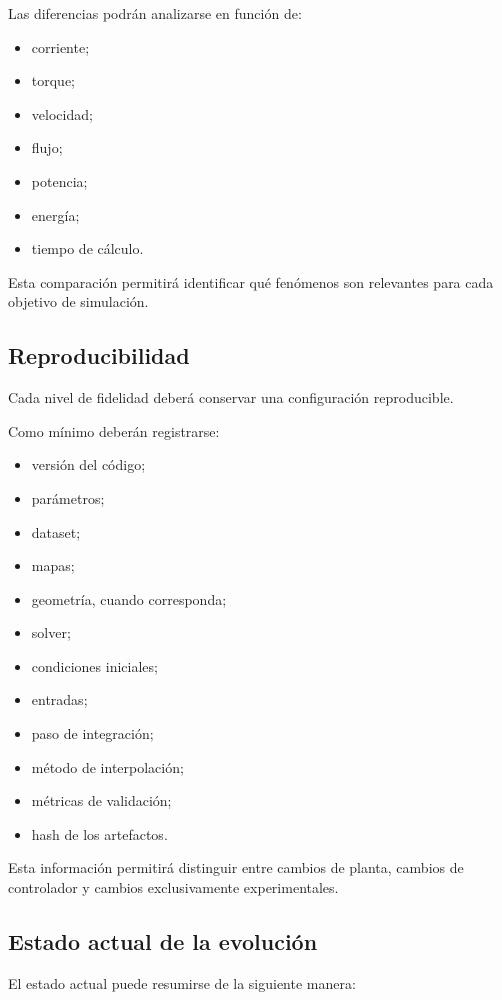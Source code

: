 Las diferencias podrán analizarse en función de:

\begin{itemize}
\item corriente;
\item torque;
\item velocidad;
\item flujo;
\item potencia;
\item energía;
\item tiempo de cálculo.
\end{itemize}

Esta comparación permitirá identificar qué fenómenos son relevantes para cada objetivo de simulación.

\subsection{Reproducibilidad}

Cada nivel de fidelidad deberá conservar una configuración reproducible.

Como mínimo deberán registrarse:

\begin{itemize}
\item versión del código;
\item parámetros;
\item dataset;
\item mapas;
\item geometría, cuando corresponda;
\item solver;
\item condiciones iniciales;
\item entradas;
\item paso de integración;
\item método de interpolación;
\item métricas de validación;
\item hash de los artefactos.
\end{itemize}

Esta información permitirá distinguir entre cambios de planta, cambios de controlador y cambios exclusivamente experimentales.

\subsection{Estado actual de la evolución}

El estado actual puede resumirse de la siguiente manera:

